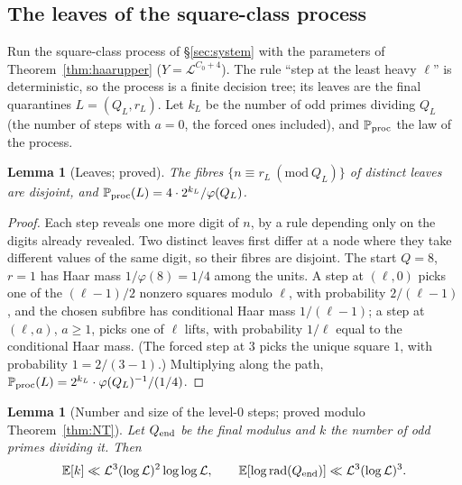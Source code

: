 \documentclass[11pt,reqno]{amsart}
\newtheorem{lemma}[theorem]{Lemma}
\theoremstyle{definition}
\newcommand{\Lc}{\mathcal L}
\newcommand{\E}{\mathbb E}
\newcommand{\PP}{\mathbb P}
\begin{document}
\subsection*{The leaves of the square-class process}
Run the square-class process of \S\ref{sec:system} with the parameters of
Theorem~\ref{thm:haarupper} ($Y=\Lc^{C_0+4}$).  The rule ``step at the least
heavy $\ell$'' is deterministic, so the process is a finite decision tree; its
leaves are the final quarantines $L=(Q_L,r_L)$.  Let $k_L$ be the number of odd
primes dividing $Q_L$ (the number of steps with $a=0$, the forced ones
included), and $\PP_{\rm proc}$ the law of the process.

\begin{lemma}[Leaves; proved]\label{lem:leaves}
The fibres $\{n\equiv r_L\ (\mathrm{mod}\ Q_L)\}$ of distinct leaves are disjoint, and
$\PP_{\rm proc}(L)=4\cdot2^{k_L}/\varphi(Q_L)$.
\end{lemma}

\begin{proof}
Each step reveals one more digit of $n$, by a rule depending only on the
digits already revealed.  Two distinct leaves first differ at a node where
they take different values of the same digit, so their fibres are disjoint.
The start $Q=8$, $r=1$ has Haar mass $1/\varphi(8)=1/4$ among the units.  A step
at $(\ell,0)$ picks one of the $(\ell-1)/2$ nonzero squares modulo $\ell$, with
probability $2/(\ell-1)$, and the chosen subfibre has conditional Haar mass
$1/(\ell-1)$; a step at $(\ell,a)$, $a\ge1$, picks one of $\ell$ lifts, with
probability $1/\ell$ equal to the conditional Haar mass.  (The forced step at
$3$ picks the unique square $1$, with probability $1=2/(3-1)$.)  Multiplying
along the path, $\PP_{\rm proc}(L)=2^{k_L}\cdot\varphi(Q_L)^{-1}/(1/4)$.
\end{proof}

\begin{lemma}[Number and size of the level-$0$ steps; proved modulo Theorem~\ref{thm:NT}]\label{lem:levelzero}
Let $Q_{\rm end}$ be the final modulus and $k$ the number of odd primes dividing it.  Then
\[
 \E[k]\ll\Lc^3(\log\Lc)^2\log\log\Lc,\qquad \E[\log\mathrm{rad}(Q_{\rm end})]\ll\Lc^3(\log\Lc)^3 .
\]
\end{lemma}
\end{document}
